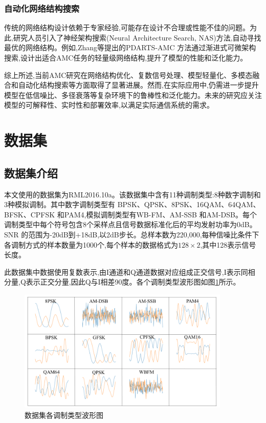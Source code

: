 \documentclass{article}
\begin{document}
\begin{CJK}{UTF8}{gbsn}
\subsubsection{自动化网络结构搜索}
传统的网络结构设计依赖于专家经验,可能存在设计不合理或性能不佳的问题。为此,研究人员引入了神经架构搜索(Neural Architecture Search, NAS)方法,自动寻找最优的网络结构。例如,Zhang等提出的PDARTS-AMC 方法通过渐进式可微架构搜索,设计出适合AMC任务的轻量级网络结构,提升了模型的性能和泛化能力。

综上所述,当前AMC研究在网络结构优化、复数信号处理、模型轻量化、多模态融合和自动化结构搜索等方面取得了显著进展。然而,在实际应用中,仍需进一步提升模型在低信噪比、多径衰落等复杂环境下的鲁棒性和泛化能力。未来的研究应关注模型的可解释性、实时性和部署效率,以满足实际通信系统的需求。

\newpage
\section{数据集}

\subsection{数据集介绍}
本文使用的数据集为RML2016.10a。该数据集中含有11种调制类型:8种数字调制和3种模拟调制。其中数字调制类型有 BPSK、QPSK、8PSK、16QAM、64QAM、BFSK、CPFSK 和PAM4,模拟调制类型有WB-FM、AM-SSB 和AM-DSB。每个调制类型中每个符号包含8个采样点且信号数据标准化后的平均发射功率为0dB。SNR 的范围为-20dB到+18dB,以2dB步长。总样本数为220,000,每种信噪比条件下各调制方式的样本数量为1000个,每个样本的数据格式为$128\times2$,其中128表示信号长度。

此数据集中数据使用复数表示,由I通道和Q通道数据对应组成正交信号,I表示同相分量,Q表示正交分量,因此Q与I相差90度。各个调制类型波形图如图\ref{fig:dataset_waveform}所示。

\begin{figure}[H]
    \centering
    \includegraphics[width=0.9\textwidth]{figure/image5.png}
    \caption{数据集各调制类型波形图}
    \label{fig:dataset_waveform}
\end{figure}


\end{CJK}
\end{document}
